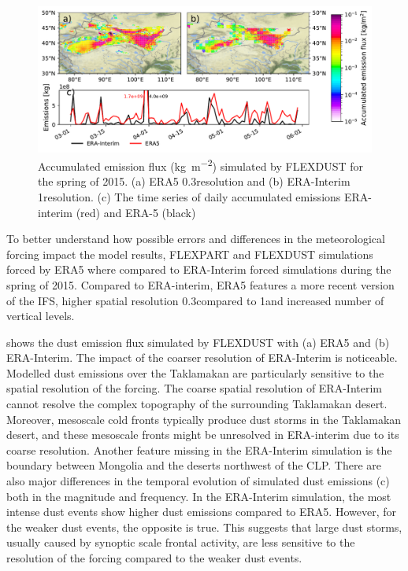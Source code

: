 \begin{figure}[htpb]
    \centering
    \includegraphics[width=\textwidth]{texfiles/figs/emissions_ERA5_ERA-interim.pdf}
    \caption{Accumulated emission flux  (\si{\kg\per\square\metre}) simulated by FLEXDUST for the spring of 2015. (a) ERA5 0.3\degree resolution and (b) ERA-Interim 1\degree resolution. (c) The time series of daily accumulated emissions ERA-interim (red) and ERA-5 (black) }
    \label{fig:ERA5_ERA-interim_emissions}
\end{figure}
To better understand how possible errors and differences in the meteorological forcing impact the model results, FLEXPART and FLEXDUST simulations forced by ERA5 where compared to ERA-Interim forced simulations during the spring of 2015. Compared to ERA-interim, ERA5 features a more recent version of the IFS, higher spatial resolution 0.3\degree compared to 1\degree and increased number of vertical levels. 

 shows the dust emission flux simulated by FLEXDUST with (a) ERA5 and (b) ERA-Interim. 
The impact of the coarser resolution of ERA-Interim is noticeable.  
Modelled dust emissions over the Taklamakan are particularly sensitive to the spatial resolution of the forcing. 
The coarse spatial resolution of ERA-Interim cannot resolve the complex topography of the surrounding Taklamakan desert. Moreover, mesoscale cold fronts typically produce dust storms in the Taklamakan desert, and these mesoscale fronts might be unresolved in ERA-interim due to its coarse resolution. 
Another feature missing in the ERA-Interim simulation is the boundary between Mongolia and the deserts northwest of the CLP. There are also major differences in the temporal evolution of simulated dust emissions (c) both in the magnitude and frequency.
In the ERA-Interim simulation, the most intense dust events show higher dust emissions compared to ERA5. However, for the weaker dust events, the opposite is true. This suggests that large dust storms, usually caused by synoptic scale frontal activity, are less sensitive to the resolution of the forcing compared to the weaker dust events.

